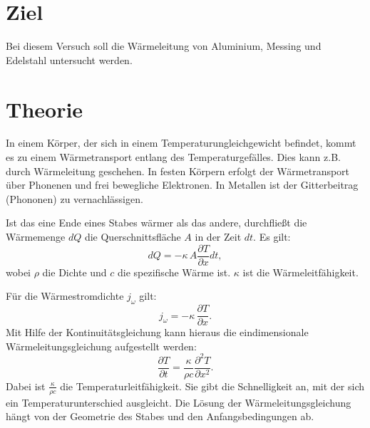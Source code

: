 \section{Ziel}
\label{sec:Ziel}

Bei diesem Versuch soll die Wärmeleitung von Aluminium, Messing und Edelstahl untersucht werden. 

\section{Theorie}
\label{sec:Theorie}

In einem Körper, der sich in einem Temperaturungleichgewicht befindet, kommt es zu einem Wärmetransport entlang 
des Temperaturgefälles. Dies kann z.B. durch Wärmeleitung geschehen. In festen Körpern erfolgt der Wärmetransport 
über Phonenen und frei bewegliche Elektronen. In Metallen ist der Gitterbeitrag (Phononen) zu vernachlässigen. 

\noindent Ist das eine Ende eines Stabes wärmer als das andere, durchfließt die Wärmemenge $dQ$ die Querschnittsfläche $A$ in der Zeit $dt$. Es gilt:
\begin{equation}
dQ = -\kappa \, A \frac{\partial T}{\partial x} dt,
\label{eqn:dQ}
\end{equation}
wobei $\rho$ die Dichte und $c$ die spezifische Wärme ist.
$\kappa$ ist die Wärmeleitfähigkeit.

\noindent Für die Wärmestromdichte $j_{\omega}$ gilt:
\begin{equation}
    j_{\omega} = -\kappa \, \frac{\partial T}{\partial x}.
    \label{eqn:jomega}
\end{equation}
Mit Hilfe der Kontinuitätsgleichung kann hieraus die eindimensionale Wärmeleitungsgleichung aufgestellt werden:
\begin{equation}
    \frac{\partial T}{\partial t} = \frac{\kappa}{\rho c} \frac{\partial^2 T}{\partial x^2}.
    \label{eq:warmeleitung}
\end{equation}
Dabei ist $\frac{\kappa}{\rho c}$ die Temperaturleitfähigkeit. Sie gibt die Schnelligkeit an, mit der sich ein 
Temperaturunterschied ausgleicht. Die Lösung der Wärmeleitungsgleichung hängt von der Geometrie des Stabes und den Anfangsbedingungen ab. 

